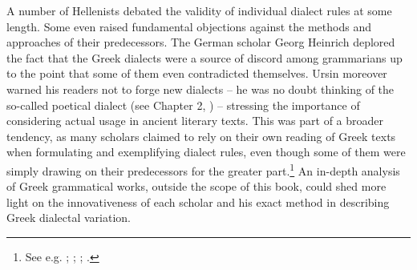 A number of Hellenists debated the validity of individual dialect rules at some length. Some even raised fundamental objections against the methods and approaches of their predecessors. The German scholar Georg Heinrich \citet[512]{Ursin1691} deplored the fact that the Greek dialects were a source of discord among grammarians up to the point that some of them even contradicted themselves. Ursin moreover warned his readers not to forge new dialects – he was no doubt thinking of the so-called poetical dialect (see Chapter 2, ) – stressing the importance of considering actual usage in ancient literary texts. This was part of a broader tendency, as many scholars claimed to rely on their own reading of Greek texts when formulating and exemplifying dialect rules, even though some of them were simply drawing on their predecessors for the greater part.\footnote{{See e.g. \citet[†.7\textsc{\textsuperscript{r}}]{Walper1589}; \citet[{\footnotesize{)(}}.4\textsc{\textsuperscript{r}}]{Portus1603}; \citet[5\textsc{\textsuperscript{[a]}}]{Merigon1621}; \citet[b.4\textsc{\textsuperscript{v}}–b.5\textsc{\textsuperscript{r}}, 432]{Nibbe1725}.}}  An in-depth analysis of Greek grammatical works, outside the scope of this book, could shed more light on the innovativeness of each scholar and his exact method in describing Greek dialectal variation.


